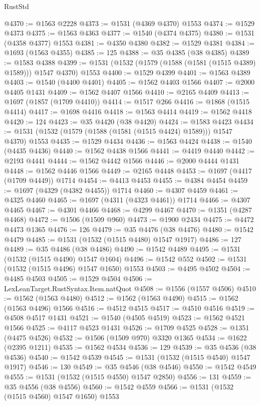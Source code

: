 \begin{lexlean}{RustStd}
\begin{coremodule}
@4370 := @1563 @2228
@4373 := @1531 (@4369 @4370) @1553
@4374 := @1529 @4373
@4375 := @1563 @4363
@4377 := @1540 (@4374 @4375)
@4380 := @1531 (@4358 @4377) @1553
@4381 := @4350 @4380
@4382 := @1529 @4381
@4384 := @1693 (@1563 @4355)
@4385 := 125
@4388 := @35 @4385 (@38 @4385)
@4389 := @1583 @4388
@4399 := @1531 (@1532 (@1579 (@1588 (@1581 (@1515 @4389) @1589))) @1547 @4370) @1553
@4400 := @1529 @4399
@4401 := @1563 @4389
@4403 := @1540 (@4400 @4401)
@4405 := @1562 @4403 @1566
@4407 := @2000 @4405 @1431
@4409 := @1562 @4407 @1566
@4410 := @2165 @4409
@4413 := @1697 (@1857 (@1709 @4410))
@4414 := @1517 @266
@4416 := @1868 (@1515 @4414)
@4417 := @1698 @4416
@4418 := @1563 @4414
@4419 := @1562 @4418
@4420 := 124
@4423 := @35 @4420 (@38 @4420)
@4424 := @1583 @4423
@4434 := @1531 (@1532 (@1579 (@1588 (@1581 (@1515 @4424) @1589))) @1547 @4370) @1553
@4435 := @1529 @4434
@4436 := @1563 @4424
@4438 := @1540 (@4435 @4436)
@4440 := @1562 @4438 @1566
@4441 := @4419 @4440
@4442 := @2193 @4441
@4444 := @1562 @4442 @1566
@4446 := @2000 @4444 @1431
@4448 := @1562 @4446 @1566
@4449 := @2165 @4448
@4453 := @1697 (@4417 (@1709 @4449)) @1714
@4454 := @4413 @4453
@4455 := @4384 @4454
@4459 := @1697 (@4329 (@4382 @4455)) @1714
@4460 := @4307 @4459
@4461 := @4325 @4460
@4465 := @1697 (@4311 (@4323 @4461)) @1714
@4466 := @4307 @4465
@4467 := @4301 @4466
@4468 := @4299 @4467
@4470 := @1351 (@4287 @4468)
@4472 := @1506 (@1509 @960)
@4473 := @1900 @2434
@4475 := @4472 @4473 @1365
@4476 := 126
@4479 := @35 @4476 (@38 @4476)
@4480 := @1542 @4479
@4485 := @1531 (@1532 (@1515 @4480) @1547 @1917)
@4486 := 127
@4489 := @35 @4486 (@38 @4486)
@4490 := @1542 @4489
@4495 := @1531 (@1532 (@1515 @4490) @1547 @1604)
@4496 := @1542 @552
@4502 := @1531 (@1532 (@1515 @4496) @1547 @1650) @1553
@4503 := @4495 @4502
@4504 := @4485 @4503
@4505 := @1529 @4504
@4506 := LexLeanTarget.RustSyntax.Item.natQuot
@4508 := @1556 (@1557 @4506)
@4510 := @1562 (@1563 @4480)
@4512 := @1562 (@1563 @4490)
@4515 := @1562 (@1563 @4496) @1566
@4516 := @4512 @4515
@4517 := @4510 @4516
@4519 := @4508 @4517 @1431
@4521 := @1540 (@4505 @4519)
@4523 := @1562 @4521 @1566
@4525 := @4117 @4523 @1431
@4526 := @1709 @4525
@4528 := @1351 (@4475 @4526)
@4532 := @1506 (@1509 @970) @3320 @1365
@4534 := @1622 (@2395 @1211)
@4535 := @1562 @4534
@4536 := 129
@4539 := @35 @4536 (@38 @4536)
@4540 := @1542 @4539
@4545 := @1531 (@1532 (@1515 @4540) @1547 @1917)
@4546 := 130
@4549 := @35 @4546 (@38 @4546)
@4550 := @1542 @4549
@4555 := @1531 (@1532 (@1515 @4550) @1547 @2850)
@4556 := 131
@4559 := @35 @4556 (@38 @4556)
@4560 := @1542 @4559
@4566 := @1531 (@1532 (@1515 @4560) @1547 @1650) @1553

\end{coremodule}
\end{lexlean}
